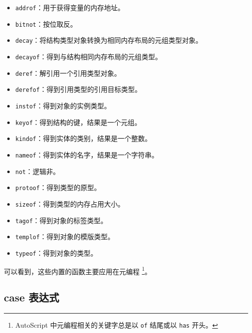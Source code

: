 \begin{itemize}
    \item \lstinline!addrof!：用于获得变量的内存地址。

    \item \lstinline!bitnot!：按位取反。

    \item \lstinline!decay!：将结构类型对象转换为相同内存布局的元组类型对象。

    \item \lstinline!decayof!：得到与结构相同内存布局的元组类型。

    \item \lstinline!deref!：解引用一个引用类型对象。

    \item \lstinline!derefof!：得到引用类型的引用目标类型。

    \item \lstinline!instof!：得到对象的实例类型。

    \item \lstinline!keyof!：得到结构的键，结果是一个元组。

    \item \lstinline!kindof!：得到实体的类别，结果是一个整数。
    
    \item \lstinline!nameof!：得到实体的名字，结果是一个字符串。

    \item \lstinline!not!：逻辑非。

    \item \lstinline!protoof!：得到类型的原型。

    \item \lstinline!sizeof!：得到类型的内存占用大小。

    \item \lstinline!tagof!：得到对象的标签类型。

    \item \lstinline!templof!：得到对象的模版类型。

    \item \lstinline!typeof!：得到对象的类型。
\end{itemize}

可以看到，这些内置的函数主要应用在元编程 \footnote{AutoScript 中元编程相关的关键字总是以 \texttt{of} 结尾或以 \texttt{has} 开头。}。

\subsection{case 表达式}

